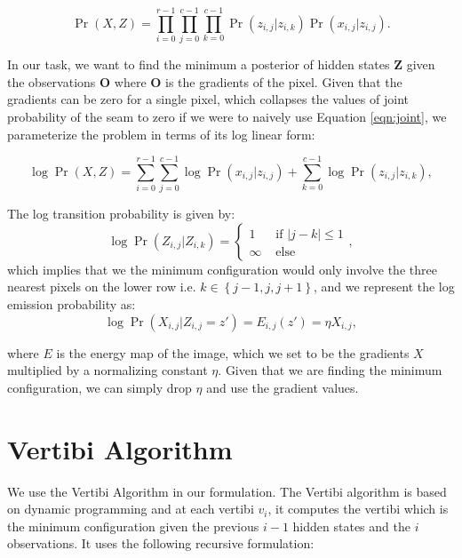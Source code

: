 \documentclass[a4paper]{article}
\begin{document}
	\begin{equation}
		\Pr(X, Z)=\prod_{i=0}^{r-1} \prod_{j=0}^{c-1} \prod_{k=0}^{c-1} \Pr\left(z_{i,j} | z_{i,k}\right) \Pr\left(x_{i,j} | z_{i,j}\right).
		\label{eqn:joint}
	\end{equation}
	
	In our task, we want to find the minimum a posterior of hidden states $\mathbf{Z}$ given the observations $\mathbf{O}$ where $\mathbf{O}$ is the gradients of the pixel. Given that the gradients can be zero for a single pixel, which collapses the values of joint probability of the seam to zero if we were to naively use Equation \ref{eqn:joint}, we parameterize the problem in terms of its log linear form:
	
	\begin{equation}
	\log\Pr(X, Z)=\sum_{i=0}^{r-1} \sum_{j=0}^{c-1} \log\Pr\left(x_{i,j} | z_{i,j}\right) + \sum_{k=0}^{c-1} \log\Pr\left(z_{i,j} | z_{i,k}\right),
	\end{equation}
	
	The log transition probability is given by: 
	\begin{equation}
		\log\Pr\left(Z_{i,j} | Z_{i,k}\right)=\left\{\begin{array}{ll}{1} & {\text { if }\left|j - k\right| \leq 1} \\ {\infty} & {\text { else }}\end{array}\right. , 
	\end{equation}
	which implies that we the minimum configuration would only involve the three nearest pixels on the lower row i.e. $k \in \left\{j-1, j, j+1\right\}$, and we represent the log emission probability as:
	\begin{equation}
		\log\Pr\left(X_{i,j} | Z_{i,j}=z'\right)=E_{i,j}(z') = \eta X_{i,j},
	\end{equation}
	
	where $E$ is the energy map of the image, which we set to be the gradients $X$ multiplied by a normalizing constant $\eta$. Given that we are finding the minimum configuration, we can simply drop $\eta$ and use the gradient values. 
	
	\section{Vertibi Algorithm}
	
	We use the Vertibi Algorithm in our formulation. The Vertibi algorithm is based on dynamic programming and at each vertibi $v_i$, it computes the vertibi which is the minimum configuration given the previous $i-1$ hidden states and the $i$ observations. It uses the following recursive formulation:
	
\end{document}
